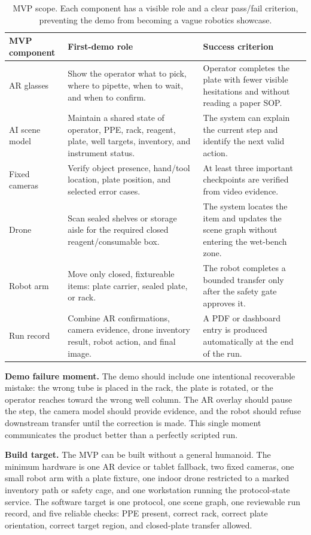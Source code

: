 \documentclass[11pt]{article}
\begin{document}
\begin{table}[htbp]
\centering
\small
\begin{tabularx}{\linewidth}{@{}L{2.55cm}Y Y@{}}
\toprule
\textbf{MVP component} & \textbf{First-demo role} & \textbf{Success criterion} \\
\midrule
AR glasses & Show the operator what to pick, where to pipette, when to wait, and when to confirm. & Operator completes the plate with fewer visible hesitations and without reading a paper SOP. \\
AI scene model & Maintain a shared state of operator, PPE, rack, reagent, plate, well targets, inventory, and instrument status. & The system can explain the current step and identify the next valid action. \\
Fixed cameras & Verify object presence, hand/tool location, plate position, and selected error cases. & At least three important checkpoints are verified from video evidence. \\
Drone & Scan sealed shelves or storage aisle for the required closed reagent/consumable box. & The system locates the item and updates the scene graph without entering the wet-bench zone. \\
Robot arm & Move only closed, fixtureable items: plate carrier, sealed plate, or rack. & The robot completes a bounded transfer only after the safety gate approves it. \\
Run record & Combine AR confirmations, camera evidence, drone inventory result, robot action, and final image. & A PDF or dashboard entry is produced automatically at the end of the run. \\
\bottomrule
\end{tabularx}
\caption{MVP scope. Each component has a visible role and a clear pass/fail criterion, preventing the demo from becoming a vague robotics showcase.}
\label{tab:mvp-scope}
\end{table}

\textbf{Demo failure moment.} The demo should include one intentional recoverable mistake: the wrong tube is placed in the rack, the plate is rotated, or the operator reaches toward the wrong well column. The AR overlay should pause the step, the camera model should provide evidence, and the robot should refuse downstream transfer until the correction is made. This single moment communicates the product better than a perfectly scripted run.

\textbf{Build target.} The MVP can be built without a general humanoid. The minimum hardware is one AR device or tablet fallback, two fixed cameras, one small robot arm with a plate fixture, one indoor drone restricted to a marked inventory path or safety cage, and one workstation running the protocol-state service. The software target is one protocol, one scene graph, one reviewable run record, and five reliable checks: PPE present, correct rack, correct plate orientation, correct target region, and closed-plate transfer allowed.
\end{document}
